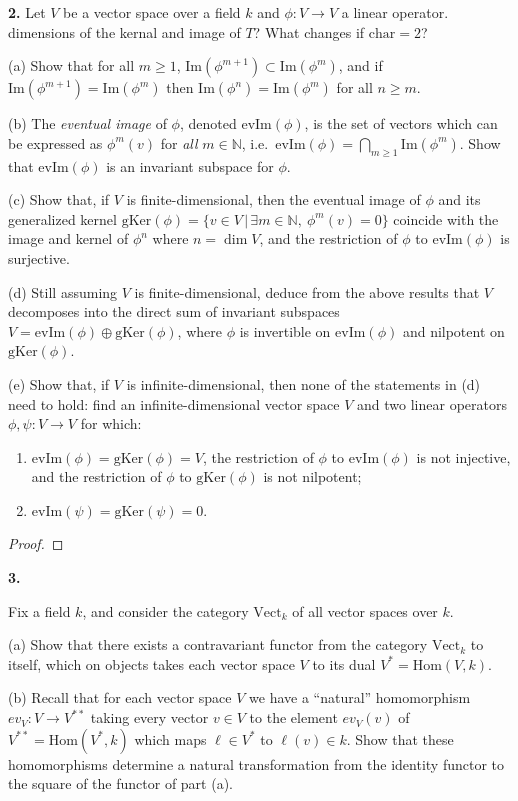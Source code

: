 \documentclass[12pt]{amsart}
\newenvironment{statement}[1]{\smallskip\noindent\color[rgb]{1.00,0.00,0.50} {\bf #1.}}{}
\theoremstyle{definition}
\theoremstyle{remark}
\newcommand{\N}{\mathbb N}
\def\Hom{\mathrm{Hom}}
\def\Im{\mathrm{Im}}
\def\Vect{\mathrm{Vect}}
\begin{document}
\begin{statement}{2}
 Let $V$ be a vector space over a field $k$ and $\phi:V\to V$ a
linear operator. dimensions of the kernal and image of \( T \)? What changes if \( \text{char}=2 \)?

(a) Show that for all $m\geq 1$, $\Im(\phi^{m+1})\subset \Im(\phi^m)$,
and if $\Im(\phi^{m+1})=\Im(\phi^m)$ then $\Im(\phi^n)=\Im(\phi^m)$ for all
$n\geq m$.

(b) The {\em eventual image} of $\phi$, denoted $\mathrm{evIm}(\phi)$, is
the set of vectors which can be expressed as $\phi^m(v)$ for {\em all}
$m\in\N$, i.e.\ $\mathrm{evIm}(\phi)=\bigcap_{m\geq 1} \Im(\phi^m)$.
Show that $\mathrm{evIm}(\phi)$ is an invariant subspace for $\phi$.

(c) Show that, if $V$ is finite-dimensional, then the eventual image of
$\phi$ and its generalized kernel $\mathrm{gKer}(\phi)=\{v\in V\,|\,
\exists m\in \N,\ \phi^m(v)=0\}$ coincide with the image and kernel of 
$\phi^n$ where $n=\dim V$, and
the restriction of $\phi$ to $\mathrm{evIm}(\phi)$ is surjective.

(d) Still assuming $V$ is finite-dimensional, deduce from the above results
that $V$ decomposes into the direct sum of invariant subspaces
$V=\mathrm{evIm}(\phi)\oplus \mathrm{gKer}(\phi)$, where $\phi$ is invertible
on $\mathrm{evIm}(\phi)$ and nilpotent on $\mathrm{gKer}(\phi)$.

(e) Show that, if $V$ is infinite-dimensional, then none of the 
statements in (d) need to hold: find an infinite-dimensional vector 
space 	$V$ and two linear operators $\phi,\psi:V\to V$ for which:
\begin{enumerate}
\item $\mathrm{evIm}(\phi)=\mathrm{gKer}(\phi)=V$,
the restriction of $\phi$ to $\mathrm{evIm}(\phi)$ is not injective,
and the restriction of $\phi$ to $\mathrm{gKer}(\phi)$ is not nilpotent;
\item $\mathrm{evIm}(\psi)=\mathrm{gKer}(\psi)=0$.
\end{enumerate}
\end{statement}
\begin{proof}
    
\end{proof}

\begin{statement}{3}
  
 Fix a field $k$, and consider the category $\Vect_k$ of
all vector spaces over $k$.

(a) Show that there exists a contravariant functor from the category $\Vect_k$ to
itself, which on objects takes each vector space $V$ to
its dual $V^*=\Hom(V,k)$.

(b) Recall that for each vector space $V$ we have a ``natural'' homomorphism 
$ev_V:V\to V^{**}$ taking every vector $v\in V$ to the element
$ev_V(v)$ of $V^{**}=\Hom(V^*,k)$ which maps $\ell\in V^*$ to $\ell(v)\in k$.
Show that these homomorphisms determine a natural transformation from
the identity functor to the square of the functor of part (a).
\end{statement}
\end{document}
